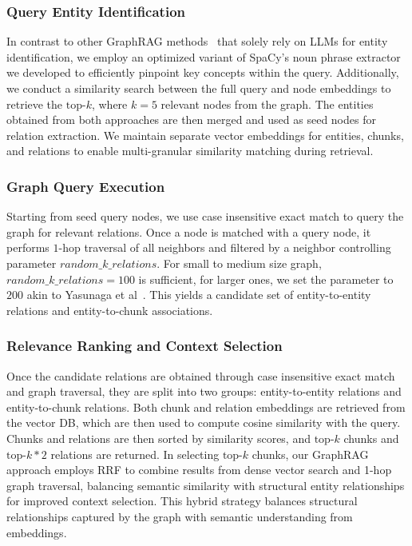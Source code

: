 \documentclass[runningheads]{llncs}
\begin{document}
\subsubsection{Query Entity Identification}
In contrast to other GraphRAG methods~\cite{guo2025lightragsimplefastretrievalaugmented,jimenez2024hipporag,fastgraphrag2025} that solely rely on LLMs for entity identification, we employ an optimized variant of SpaCy's noun phrase extractor we developed to efficiently pinpoint key concepts within the query. Additionally, we conduct a similarity search between the full query and node embeddings to retrieve the $\text{top-}k$, where $k=5$ relevant nodes from the graph. The entities obtained from both approaches are then merged and used as seed nodes for relation extraction. We maintain separate vector embeddings for entities, chunks, and relations to enable multi-granular similarity matching during retrieval.
\vspace{-4mm}
\subsubsection{Graph Query Execution}
Starting from seed query nodes, we use case insensitive exact match to query the graph for relevant relations. Once a node is matched with a query node, it performs $1$-hop traversal of all neighbors and filtered by a neighbor controlling parameter $random\_k\_relations$. For small to medium size graph, $random\_k\_relations=100$ is sufficient, for larger ones, we set the parameter to $200$ akin to Yasunaga et al~\cite{yasunaga2022deepbidirectionallanguageknowledgegraph}. This yields a candidate set of entity-to-entity relations and entity-to-chunk associations.
\vspace{-4mm}
\subsubsection{Relevance Ranking and Context Selection}
Once the candidate relations are obtained through case insensitive exact match and graph traversal, they are split into two groups: entity-to-entity relations and entity-to-chunk relations. Both chunk and relation embeddings are retrieved from the vector DB, which are then used to compute cosine similarity with the query. Chunks and relations are then sorted by similarity scores, and $\text{top-}k$ chunks and $\text{top-}k *2$ relations are returned. In selecting $\text{top-}k$ chunks, our GraphRAG approach employs RRF to combine results from dense vector search and 1-hop graph traversal, balancing semantic similarity with structural entity relationships for improved context selection. This hybrid strategy balances structural relationships captured by the graph with semantic understanding from embeddings. 
\vspace{-4mm}
\end{document}
